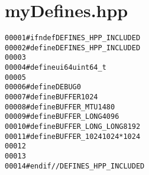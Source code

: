 \hypertarget{myDefines_8hpp_source}{
\section{myDefines.hpp}
}


\begin{footnotesize}\begin{alltt}
00001 \textcolor{preprocessor}{#ifndef DEFINES\_HPP\_INCLUDED}
00002 \textcolor{preprocessor}{}\textcolor{preprocessor}{#define DEFINES\_HPP\_INCLUDED}
00003 \textcolor{preprocessor}{}
00004 \textcolor{preprocessor}{#define ui64 uint64\_t}
00005 \textcolor{preprocessor}{}
00006 \textcolor{preprocessor}{#define DEBUG            0}
00007 \textcolor{preprocessor}{}\textcolor{preprocessor}{#define BUFFER           1024}
00008 \textcolor{preprocessor}{}\textcolor{preprocessor}{#define BUFFER\_MTU       1480}
00009 \textcolor{preprocessor}{}\textcolor{preprocessor}{#define BUFFER\_LONG      4096}
00010 \textcolor{preprocessor}{}\textcolor{preprocessor}{#define BUFFER\_LONG\_LONG 8192}
00011 \textcolor{preprocessor}{}\textcolor{preprocessor}{#define BUFFER\_1024      1024*1024}
00012 \textcolor{preprocessor}{}
00013 
00014 \textcolor{preprocessor}{#endif // DEFINES\_HPP\_INCLUDED}
\end{alltt}\end{footnotesize}
